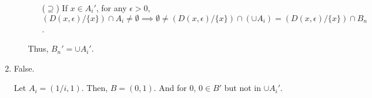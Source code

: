 \documentclass[12pt]{article}
\begin{document}
\begin{enumerate}
\begin{enumerate}
\begin{enumerate}
            \item[($\supseteq$)] If $x \in A_i'$, for any $\epsilon > 0$, $(D(x, \epsilon)/\lbrace x \rbrace) \cap A_i \neq \emptyset\implies \emptyset \neq (D(x, \epsilon) / \lbrace x \rbrace) \cap (\cup A_i) = (D(x, \epsilon) / \lbrace x \rbrace) \cap B_n$.
        \end{enumerate}

        Thus, $B_n' = \cup A_i'$.
    \end{enumerate}

    \item False.
    
    Let $A_i = (1/i, 1)$. Then, $B = (0, 1)$. And for $0$, $0 \in B'$ but not in $\cup A_i'$.
\end{enumerate}
\end{document}
